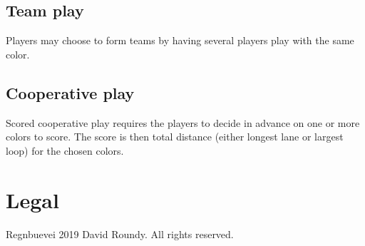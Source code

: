 \documentclass[twocolumn, 12pt]{article}
\begin{document}
\subsection*{Team play}
Players may choose to form teams by having several players play with
the same color.
\subsection*{Cooperative play}
Scored cooperative play requires the players to decide in advance on
one or more colors to score.  The score is then total distance (either
longest lane or largest loop) for the chosen colors.

\section{Legal}
Regnbuevei 2019 David Roundy. All rights reserved.
\end{document}
